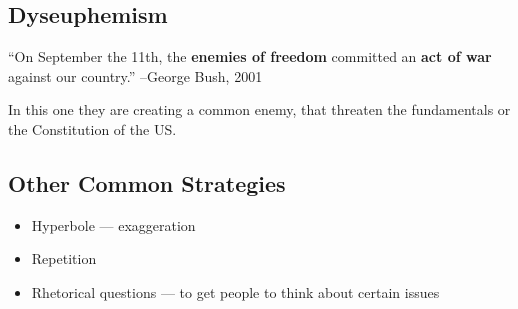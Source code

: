 \documentclass[../main.tex]{subfiles}
\begin{document}
			\subsection{Dyseuphemism}
				``On September the 11th, the \textbf{enemies of freedom} committed an \textbf{act of war} against our country.'' --George Bush, 2001 \par
				In this one they are creating a common enemy, that threaten the fundamentals or the Constitution of the US.

			\subsection{Other Common Strategies}
				\begin{itemize}
					\item Hyperbole --- exaggeration 
					\item Repetition
					\item Rhetorical questions --- to get people to think about certain issues
				\end{itemize}

\end{document}
